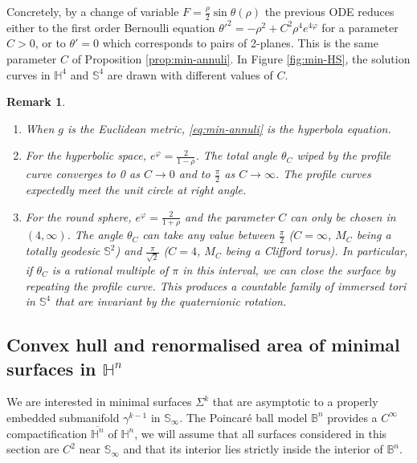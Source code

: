 \documentclass[11pt]{article}
\newtheorem{remark}[theorem]{Remark}
\begin{document}
Concretely, by a change of variable \(F=\frac{\rho}{2}\sin\theta(\rho)\) the previous ODE reduces either to the first order Bernoulli equation
\(\theta'^2 = -\rho^2 + C^2\rho^4 e^{4\varphi}\) for a parameter \(C > 0\),
or to \(\theta'=0\) which corresponds to pairs of 2-planes. This is the same parameter
\(C\) of Proposition \ref{prop:min-annuli}.
In Figure \ref{fig:min-HS}, the solution curves in \(\mathbb{H}^4\) and \(\mathbb{S}^4\) are drawn with different
values of \(C\).



\begin{remark}
\label{rem:min-annuli}
\begin{enumerate}
\item When \(g\) is the Euclidean metric, \eqref{eq:min-annuli} is
the hyperbola equation.
\item For the hyperbolic space, \(e^\varphi = \frac{2}{1-\rho}\). The total angle \(\theta_C\) wiped by the profile curve converges to 0 as
\(C\to 0\) and to \(\frac{\pi}{2}\) as \(C\to\infty\). The profile curves expectedly meet
the unit circle at right angle.
\item For the round sphere, \(e^\varphi = \frac{2}{1+\rho}\) and the parameter \(C\) can only be chosen in \((4,\infty)\). The angle \(\theta_C\) can take any value between \(\frac{\pi}{2}\) (\(C=\infty\), \(M_C\) being a totally geodesic \(\mathbb{S}^2\)) and
\(\frac{\pi}{\sqrt{2}}\) (\(C=4\), \(M_C\) being a Clifford torus). In particular, if \(\theta_C\) is a
rational multiple of \(\pi\) in this interval, we can close the surface by repeating
the profile curve. This produces a countable family of immersed tori in \(\mathbb{S}^4\) that are invariant by the quaternionic rotation.
\end{enumerate}
\end{remark}
\subsection{Convex hull and renormalised area of minimal surfaces in \(\mathbb{H}^n\)}
\label{sec:orga6b30d6}
We are interested in minimal surfaces \(\Sigma^k\)
that are asymptotic to a properly embedded submanifold \(\gamma^{k-1}\) in \(\mathbb{S}_\infty\). The Poincaré ball model \(\mathbb{B}^n\) provides a \(C^\infty\)
compactification \(\overline{\mathbb{H}^n}\) of \(\mathbb{H}^n\), we will assume that
all surfaces considered in this section are \(C^2\)
near \(\mathbb{S}_\infty\) and that its interior lies strictly inside the interior of \(\mathbb{B}^n\).
\end{document}
